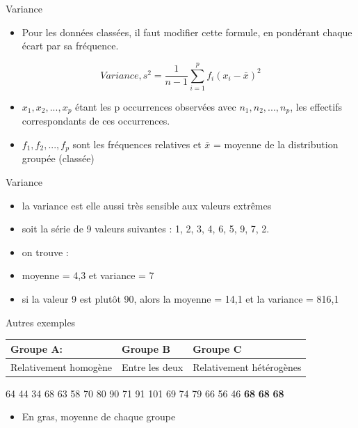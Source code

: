 \documentclass[
  ignorenonframetext,
]{beamer}
\providecommand{\tightlist}{%
  \setlength{\itemsep}{0pt}\setlength{\parskip}{0pt}}
\begin{document}
\begin{frame}{Variance}
\protect\hypertarget{variance-1}{}
\begin{itemize}
\tightlist
\item
  Pour les données classées, il faut modifier cette formule, en
  pondérant chaque écart par sa fréquence.
\end{itemize}

\[Variance, s^2 = \frac{1}{n-1} \sum_{i=1}^p f_i(x_i - \bar{x})^2\]

\begin{itemize}
\item
  \(x_1, x_2, ... , x_p\) étant les p occurrences observées avec
  \(n_1, n_2, ... , n_p\), les effectifs correspondants de ces
  occurrences.
\item
  \(f_1, f_2, ... , f_p\) sont les fréquences relatives et \(\bar{x}\) =
  moyenne de la distribution groupée (classée)
\end{itemize}
\end{frame}

\begin{frame}{Variance}
\protect\hypertarget{variance-2}{}
\begin{itemize}
\tightlist
\item
  la variance est elle aussi très sensible aux valeurs extrêmes
\item
  soit la série de 9 valeurs suivantes : 1, 2, 3, 4, 6, 5, 9, 7, 2.
\item
  on trouve :
\item
  moyenne = 4,3 et variance = 7
\item
  si la valeur 9 est plutôt 90, alors la moyenne = 14,1 et la variance =
  816,1
\end{itemize}
\end{frame}

\begin{frame}{Autres exemples}
\protect\hypertarget{autres-exemples}{}
\begin{longtable}[]{@{}lll@{}}
\toprule()
Groupe A: & Groupe B & Groupe C \\
\midrule()
\endhead
Relativement homogène & Entre les deux & Relativement hétérogènes \\
\bottomrule()
\end{longtable}

64 44 34 68 63 58 70 80 90 71 91 101 69 74 79 66 56 46 \textbf{68}
\textbf{68} \textbf{68}

\begin{itemize}
\tightlist
\item
  En gras, moyenne de chaque groupe
\end{itemize}
\end{frame}
\end{document}
